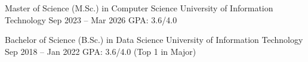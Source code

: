 
\education
    {Master of Science (M.Sc.) in Computer Science}
    {University of Information Technology}
    {Sep 2023 -- Mar 2026}
    {GPA: 3.6/4.0}

\education
    {Bachelor of Science (B.Sc.) in Data Science}
    {University of Information Technology}
    {Sep 2018 -- Jan 2022}
    {GPA: 3.6/4.0 (Top 1 in Major)}
